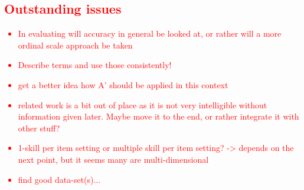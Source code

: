 \documentclass{scrartcl}
\newcommand\todo[1]{\textcolor{red}{#1}}
\begin{document}
\begin{comment}
\begin{mycapequ}
\begin{equation}
\begin{aligned}
    \gamma_{c}:  & \gamma_{c}*\frac{\sum_{s \in S} \eta_{s}*g_{s,c}} {|g_{c}|} \\
    \rho_{c}:  & \rho_{c}*\frac{\sum_{s \in S} \eta_{s}*f_{s,c}} {|f_{c}|} \\
    \theta_{s,0}: & \theta_{s,0}*\frac {\sum_{c \in KC} \alpha_{c}*t_{s,c}} {|t_{s}|}
\end{aligned}
\end{equation}
\caption{Comparison of PFA parameters to full model parameters}
\end{mycapequ}

\begin{mycapequ}
\begin{equation}
\begin{aligned}
    \eta_{s}: \eta_{s}* \frac{\sum_{c \in KC} \frac{\gamma_{c} g_{c} +  f_{c}}{\alpha_{c}}}{g_{c}+f_{c}} \\
    \beta_{c}:  & \rho_{c}*\frac{\sum_{s \in S} \eta_{s}*f_{s,c}} {|f_{c}|}
\end{aligned}
\end{equation}
\caption{Comparison of seIRT parameters to full model parameters}
\end{mycapequ}
\end{comment}


\todo{
\section{Outstanding issues}
\begin{itemize}
\item In evaluating will accuracy in general be looked at, or rather will a more ordinal scale approach be taken
\item Describe terms and use those consistently!
\item get a better idea how A' should be applied in this context
\item related work is a bit out of place as it is not very intelligible without information given later. Maybe move it to the end, or rather integrate it with other stuff?
\item 1-skill per item setting or multiple skill per item setting? -> depends on the next point, but it seems many are multi-dimensional
\item find good data-set(s)...
\end{itemize}
}

\newpage
\appendix
\end{document}
